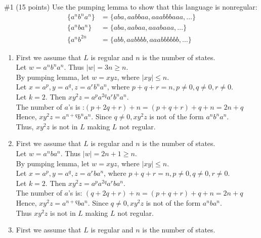 \begin{problem}{\#1 (15 points)}
    Use the pumping lemma to show that this language is nonregular:
    \begin{align*}
        \{a^nb^na^n\} &= \{aba,aabbaa,aaabbbaaa,\ldots\}\\
        \{a^nba^n\} &= \{aba,aabaa,aaabaaa,\ldots\}\\
        \{a^nb^{2n} &= \{abb,aabbbb,aaabbbbbb,\ldots\}
    \end{align*}
\end{problem}
\begin{solution}
    \begin{enumerate}
        \item 
        First we assume that $L$ is regular and $n$ is the number of states.\\
        Let $w = a^nb^na^n$. Thus $|w| = 3n \geq n$.\\
        By pumping lemma, let $w = xyz$, where $|xy|\leq n$.\\
        Let $x=a^p,y=a^q,z=a^rb^na^n$, where $p+q+r=n, p\neq 0, q \neq 0, r\neq 0$.\\
        Let $k=2$. Then $xy^2z=a^pa^{2q}a^rb^na^n$.\\
        The number of $a$'s is :$\left( p+2q+r \right)+n=\left( p+q+r \right)+q+n = 2n+q$\\
        Hence, $xy^2z=a^{n+q}b^na^n$. Since $q\neq 0, xy^2z$ is not of the form $a^nb^na^n$.\\
        Thus, $xy^2z$ is not in $L$ making $L$ not regular.
        \item First we assume that $L$ is regular and $n$ is the number of states.\\
        Let $w = a^nba^n$. Thus $|w| = 2n+1 \geq n$.\\
        By pumping lemma, let $w=xyz$, where $|xy|\leq n$.\\
        Let $x=a^p,y=a^q,z=a^rba^n$, where $p+q+r=n,p\neq 0,q\neq 0, r\neq 0$.\\
        Let $k=2$. Then $xy^2z=a^pa^{2q}a^rba^n$.\\
        The number of $a$'s is: $\left( q+2q+r \right)+n=\left( p+q+r \right)+q+n = 2n+q$\\
        Hence, $xy^2z=a^{n+q}ba^n$. Since $q\neq 0, xy^2z$ is not of the form $a^nba^n$.\\
        Thus $xy^2z$ is not in $L$ making $L$ not regular. 
        \item First we assume that $L$ is regular and $n$ is the number of states.\\

\end{enumerate}
\end{solution}
